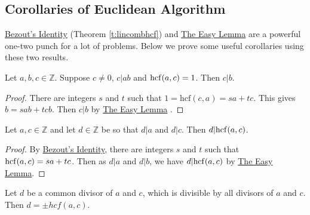 \documentclass[11pt,dvipsnames]{book}
\def\Z{\mathbb{Z}}
\def\hcf{{\rm hcf}}
\numberwithin{equation}{section} %
\numberwithin{figure}{section} %
\numberwithin{table}{section} %
\begin{document}

\subsection{Corollaries of Euclidean Algorithm}

 \hyperref[t:lincombhcf]{ Bezout's Identity} (Theorem \ref{t:lincombhcf}) and \hyperref[l:easy-lemma]{The Easy Lemma}  are a powerful one-two punch for a lot of problems. Below we prove some useful corollaries using these two results. 

 \begin{corollary} 
 \label{c:c|abc|b}
 Let $a,b,c\in\Z$. Suppose $c\neq
0$, $c|ab$ and $\hcf(a,c)=1$. Then $c|b$. 
\end{corollary}

\begin{proof}
There are integers $s$ and $t$ such that $1=\mathrm{hcf}(c,a)=sa+tc$. This gives $b=sab+tcb$.  Then $c|b$ by \hyperref[l:easy-lemma]{The Easy Lemma} . 
 \end{proof}
 
\begin{corollary} Let $a,c\in\Z$ and let $d\in\mathbb{Z}$ be so that $d|a$ and $d|c$.  Then $d|\hcf(a,c)$. 
\end{corollary}

\begin{proof}
By  \hyperref[t:lincombhcf]{ Bezout's Identity}, there are integers $s$ and $t$ such that
$\hcf(a,c)=sa+tc$.
 Then as $d|a$ and $d|b$, we have $d|\hcf(a,c)$ by \hyperref[l:easy-lemma]{The Easy Lemma}. 
\end{proof}

\begin{corollary} Let $d$ be a common divisor of
 $a$ and $c$, which is divisible by all divisors of $a$ and $c$. Then $d = \pm hcf(a,c)$.
\end{corollary}
\end{document}
